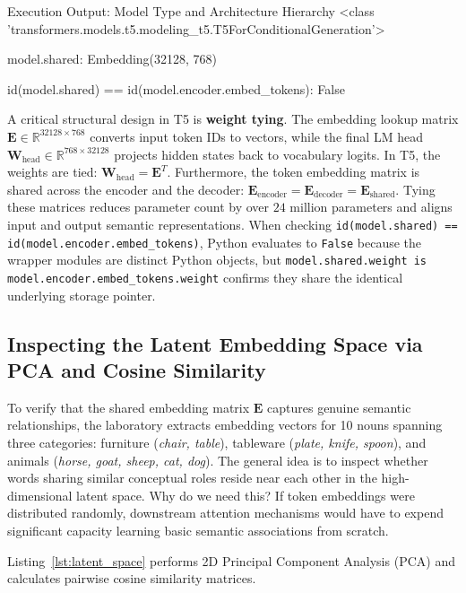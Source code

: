 \documentclass[11pt,a4paper]{article}
\begin{document}
\begin{macterminal}{Execution Output: Model Type and Architecture Hierarchy}
<class 'transformers.models.t5.modeling_t5.T5ForConditionalGeneration'>

model.shared:
Embedding(32128, 768)

id(model.shared) == id(model.encoder.embed_tokens): False
\end{macterminal}

A critical structural design in T5 is \textbf{weight tying}. The embedding lookup matrix $\mathbf{E} \in \mathbb{R}^{32128 \times 768}$ converts input token IDs to vectors, while the final LM head $\mathbf{W}_{\text{head}} \in \mathbb{R}^{768 \times 32128}$ projects hidden states back to vocabulary logits. In T5, the weights are tied: $\mathbf{W}_{\text{head}} = \mathbf{E}^T$. Furthermore, the token embedding matrix is shared across the encoder and the decoder: $\mathbf{E}_{\text{encoder}} = \mathbf{E}_{\text{decoder}} = \mathbf{E}_{\text{shared}}$. Tying these matrices reduces parameter count by over $24$ million parameters and aligns input and output semantic representations. When checking \texttt{id(model.shared) == id(model.encoder.embed\_tokens)}, Python evaluates to \texttt{False} because the wrapper modules are distinct Python objects, but \texttt{model.shared.weight is model.encoder.embed\_tokens.weight} confirms they share the identical underlying storage pointer.

\subsection{Inspecting the Latent Embedding Space via PCA and Cosine Similarity}

To verify that the shared embedding matrix $\mathbf{E}$ captures genuine semantic relationships, the laboratory extracts embedding vectors for 10 nouns spanning three categories: furniture (\emph{chair, table}), tableware (\emph{plate, knife, spoon}), and animals (\emph{horse, goat, sheep, cat, dog}). The general idea is to inspect whether words sharing similar conceptual roles reside near each other in the high-dimensional latent space. Why do we need this? If token embeddings were distributed randomly, downstream attention mechanisms would have to expend significant capacity learning basic semantic associations from scratch.

Listing~\ref{lst:latent_space} performs 2D Principal Component Analysis (PCA) and calculates pairwise cosine similarity matrices.
\end{document}
